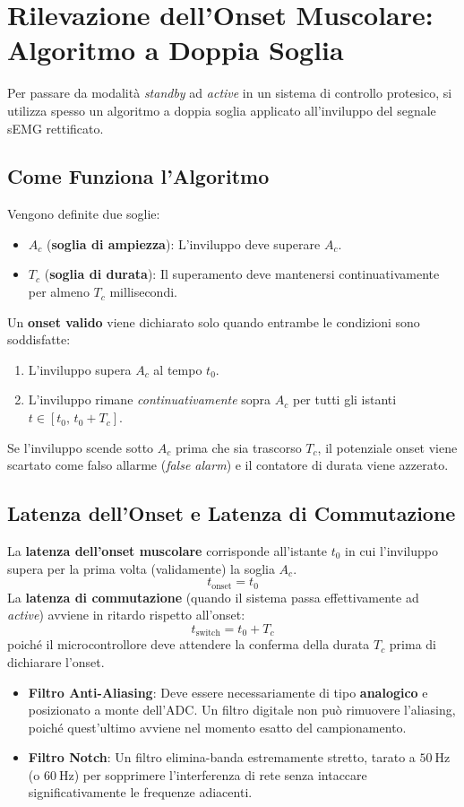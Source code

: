\documentclass[10pt, letterpaper]{report}
\begin{document}
\section{Rilevazione dell'Onset Muscolare: Algoritmo a Doppia Soglia}
Per passare da modalità \emph{standby} ad \emph{active} in un sistema di controllo protesico, si utilizza spesso un algoritmo a doppia soglia applicato all'inviluppo del segnale sEMG rettificato.

\subsection{Come Funziona l'Algoritmo}
Vengono definite due soglie:
\begin{itemize}
    \item $A_c$ (\textbf{soglia di ampiezza}): L'inviluppo deve superare $A_c$.
    \item $T_c$ (\textbf{soglia di durata}): Il superamento deve mantenersi continuativamente per almeno $T_c$ millisecondi.
\end{itemize}
Un \textbf{onset valido} viene dichiarato solo quando entrambe le condizioni sono soddisfatte:
\begin{enumerate}
    \item L'inviluppo supera $A_c$ al tempo $t_0$.
    \item L'inviluppo rimane \emph{continuativamente} sopra $A_c$ per tutti gli istanti $t \in [t_0,\, t_0 + T_c]$.
\end{enumerate}
Se l'inviluppo scende sotto $A_c$ prima che sia trascorso $T_c$, il potenziale onset viene scartato come falso allarme (\emph{false alarm}) e il contatore di durata viene azzerato.

\subsection{Latenza dell'Onset e Latenza di Commutazione}
La \textbf{latenza dell'onset muscolare} corrisponde all'istante $t_0$ in cui l'inviluppo supera per la prima volta (validamente) la soglia $A_c$.
\[
t_{\text{onset}} = t_0
\]
La \textbf{latenza di commutazione} (quando il sistema passa effettivamente ad \emph{active}) avviene in ritardo rispetto all'onset:
\[
t_{\text{switch}} = t_0 + T_c
\]
poiché il microcontrollore deve attendere la conferma della durata $T_c$ prima di dichiarare l'onset.
\begin{itemize}
    \item \textbf{Filtro Anti-Aliasing}: Deve essere necessariamente di tipo \textbf{analogico} e posizionato a monte dell'ADC.
    Un filtro digitale non può rimuovere l'aliasing, poiché quest'ultimo avviene nel momento esatto del campionamento.
    \item \textbf{Filtro Notch}: Un filtro elimina-banda estremamente stretto, tarato a $50\ \text{Hz}$ (o $60\ \text{Hz}$) per sopprimere l'interferenza di rete senza intaccare significativamente le frequenze adiacenti.
\end{itemize}
\end{document}
